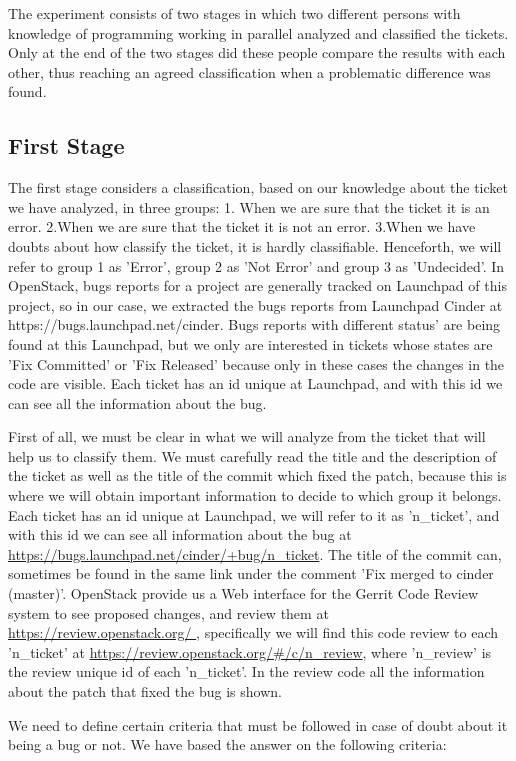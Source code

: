 \documentclass[a4paper]{article}
\begin{document}
The experiment consists of two stages in which two different persons with knowledge of programming working in parallel analyzed and classified the tickets. Only at the end of the two stages did these people compare the results with each other, thus reaching an agreed classification when a problematic difference was found.
\subsection{First Stage}
The first stage considers a classification, based on our knowledge about the ticket we have analyzed, in three groups: 1. When we are sure that the ticket it is an error. 2.When we are sure that the ticket it is not an error. 3.When we have doubts about how classify the ticket, it is hardly classifiable. Henceforth, we will refer to group 1 as 'Error', group 2 as 'Not Error' and group 3 as 'Undecided'. In OpenStack, bugs reports for a project are generally tracked on Launchpad of this project, so in our case, we extracted the bugs reports from Launchpad Cinder at https://bugs.launchpad.net/cinder. Bugs reports with different status' are being found at this Launchpad, but we only are interested in tickets whose states are 'Fix Committed' or 'Fix Released' because only in these cases the changes in the code are visible. Each ticket has an id unique at Launchpad, and with this id we can see all the information about the bug. 

First of all, we must be clear in what we will analyze from the ticket that will help us to classify them. We must carefully read the title and the description of the ticket as well as the title of the commit which fixed the patch, because this is where we will obtain important information to decide to which group it belongs. Each ticket has an id unique at Launchpad, we will refer to it as 'n\_ticket', and with this id we can see all information about the bug at  \url{https://bugs.launchpad.net/cinder/+bug/n_ticket}. The title of the commit can, sometimes be found in the same link under the comment 'Fix merged to cinder (master)'. OpenStack provide us a Web interface for the Gerrit Code Review system to see proposed changes, and review them at \url{https://review.openstack.org/ }, specifically we will find this code review to each 'n\_ticket' at \url{https://review.openstack.org/#/c/n_review}, where 'n\_review' is the review unique id of each 'n\_ticket'. In the review code all the information about the patch that fixed the bug is shown.

We need to define certain criteria that must be followed in case of doubt about it being a bug or not. We have based the answer on the following criteria: 
\end{document}
